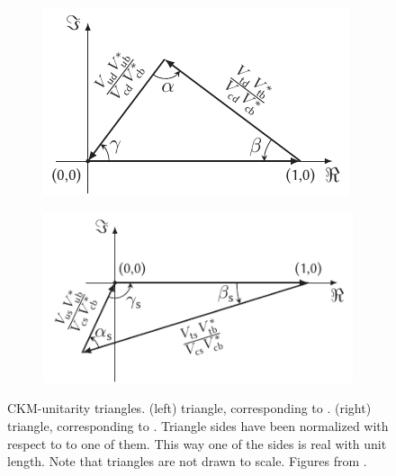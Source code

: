 \begin{figure}[h]
  \centering
  \begin{subfigure}{0.475\textwidth}
    \raggedright
    \includegraphics[width=\textwidth]{Figures/Chapter1/b-d-triangle}
    \caption{}
    \label{unitTriangles_bd}
  \end{subfigure}%
  \hfill%
  \begin{subfigure}{0.525\textwidth}
    \raggedleft
    \includegraphics[width=\textwidth]{Figures/Chapter1/b-s-triangle}
    \caption{}
    \label{unitTriangles_bs}
  \end{subfigure}
  \caption{CKM-unitarity triangles. (left) \Bd triangle, corresponding to . (right) \Bs triangle,
           corresponding to . Triangle sides have been normalized with respect to to one of them.
           This way one of the sides is real with unit length. Note that triangles are not drawn to scale. Figures from \cite{jeroenThesis}. }
  \label{unitTriangles}
\end{figure}

